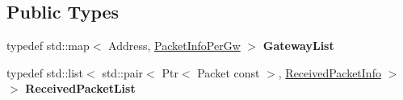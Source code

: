 \subsection*{Public Types}
\begin{DoxyCompactItemize}
\item 
\mbox{\label{classns3_1_1lorawan_1_1EndDeviceStatus_a85bd7a844d001f0a3e04d14165e3be70}} 
typedef std\+::map$<$ Address, \hyperlink{structns3_1_1lorawan_1_1EndDeviceStatus_1_1PacketInfoPerGw}{Packet\+Info\+Per\+Gw} $>$ {\bfseries Gateway\+List}
\item 
\mbox{\label{classns3_1_1lorawan_1_1EndDeviceStatus_a081d59ec2c06b37e925710efca555da0}} 
typedef std\+::list$<$ std\+::pair$<$ Ptr$<$ Packet const  $>$, \hyperlink{structns3_1_1lorawan_1_1EndDeviceStatus_1_1ReceivedPacketInfo}{Received\+Packet\+Info} $>$ $>$ {\bfseries Received\+Packet\+List}
\end{DoxyCompactItemize}
